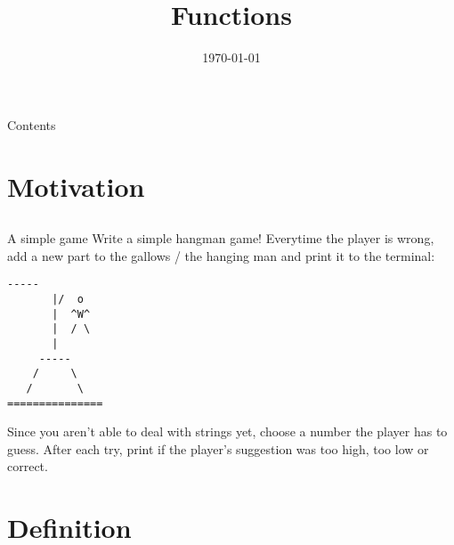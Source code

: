 
\newcommand {\topic}{
    Functions
}

\title{\topic}
\supertitle{\course}
\date{\today}



\maketitle

\begin{frame}{Contents}
    \tableofcontents
\end{frame}

\section{Motivation}
\subsection{}
\begin{frame}[fragile]{A simple game}
	Write a simple hangman game! Everytime the player is wrong,
	add a new part to the gallows / the hanging man and print it to the terminal:
	\begin{lstlisting}[numbers=none]
       -----    
       |/  o 
       |  ^W^
       |  / \
       |     
     -----   
    /     \
   /       \
===============
\end{lstlisting}
	
	Since you aren't able to deal with strings yet, choose a number the player has to guess.
	After each try, print if the player's suggestion was too high, too low or correct.

\end{frame}
\begin{frame}

\end{frame}
\section{Definition}
\begin{frame}

\end{frame}



